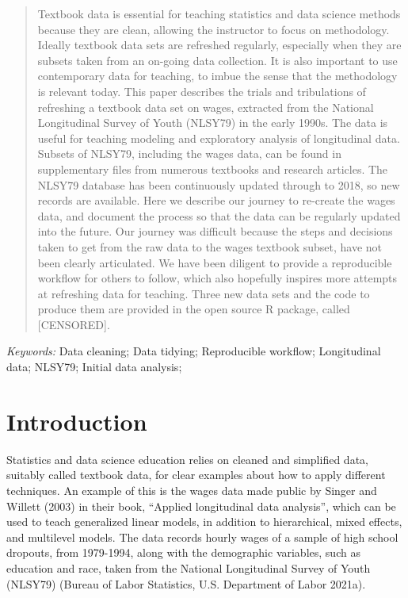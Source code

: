 \documentclass[12pt]{article}
\def\spacingset#1{\renewcommand{\baselinestretch}%
{#1}\small\normalsize} \spacingset{1}
\begin{document}
\bigskip
\begin{abstract}
Textbook data is essential for teaching statistics and data science methods because they are clean, allowing the instructor to focus on methodology. Ideally textbook data sets are refreshed regularly, especially when they are subsets taken from an on-going data collection. It is also important to use contemporary data for teaching, to imbue the sense that the methodology is relevant today. This paper describes the trials and tribulations of refreshing a textbook data set on wages, extracted from the National Longitudinal Survey of Youth (NLSY79) in the early 1990s. The data is useful for teaching modeling and exploratory analysis of longitudinal data. Subsets of NLSY79, including the wages data, can be found in supplementary files from numerous textbooks and research articles. The NLSY79 database has been continuously updated through to 2018, so new records are available. Here we describe our journey to re-create the wages data, and document the process so that the data can be regularly updated into the future. Our journey was difficult because the steps and decisions taken to get from the raw data to the wages textbook subset, have not been clearly articulated. We have been diligent to provide a reproducible workflow for others to follow, which also hopefully inspires more attempts at refreshing data for teaching. Three new data sets and the code to produce them are provided in the open source R package, called {[}CENSORED{]}.
\end{abstract}

\noindent%
{\it Keywords:}  Data cleaning; Data tidying; Reproducible workflow; Longitudinal data; NLSY79; Initial data analysis;
\vfill

\newpage
\spacingset{1.45} %

\hypertarget{intro}{%
\section{Introduction}\label{intro}}

Statistics and data science education relies on cleaned and simplified data, suitably called textbook data, for clear examples about how to apply different techniques. An example of this is the wages data made public by Singer and Willett (2003) in their book, ``Applied longitudinal data analysis'', which can be used to teach generalized linear models, in addition to hierarchical, mixed effects, and multilevel models. The data records hourly wages of a sample of high school dropouts, from 1979-1994, along with the demographic variables, such as education and race, taken from the National Longitudinal Survey of Youth (NLSY79) (Bureau of Labor Statistics, U.S. Department of Labor 2021a).
\end{document}
